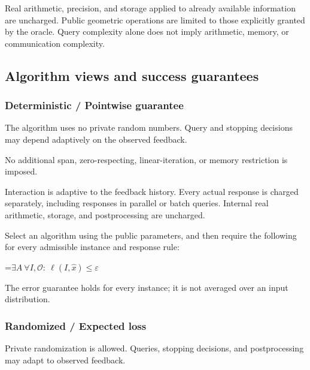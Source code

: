 \documentclass[10pt,a4paper]{article}
\newcommand{\AtlasMath}[1]{\par\begingroup\centering\setbox0=\hbox{$\displaystyle #1$}\ifdim\wd0>1.4\linewidth\typeout{ATLAS WIDE FORMULA: \the\wd0}\fi\ifdim\wd0>\linewidth\resizebox{\linewidth}{!}{\box0}\else\box0\fi\par\endgroup}
\begin{document}
Real arithmetic, precision, and storage applied to already available information are uncharged. Public geometric operations are limited to those explicitly granted by the oracle. Query complexity alone does not imply arithmetic, memory, or communication complexity.



\subsection{Algorithm views and success guarantees}


\subsubsection{Deterministic / Pointwise guarantee}


The algorithm uses no private random numbers. Query and stopping decisions may depend adaptively on the observed feedback.



No additional span, zero-respecting, linear-iteration, or memory restriction is imposed.



Interaction is adaptive to the feedback history. Every actual response is charged separately, including responses in parallel or batch queries. Internal real arithmetic, storage, and postprocessing are uncharged.



Select an algorithm using the public parameters, and then require the following for every admissible instance and response rule:




\AtlasMath{\exists A\ \forall I,\mathcal{O}:\ \ell(I,\widehat{x})\le\varepsilon}




The error guarantee holds for every instance; it is not averaged over an input distribution.



\subsubsection{Randomized / Expected loss}


Private randomization is allowed. Queries, stopping decisions, and postprocessing may adapt to observed feedback.
\end{document}
